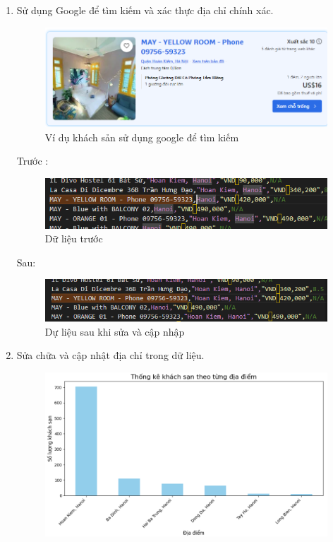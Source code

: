 \begin{itemize}
\begin{enumerate}
        \item Sử dụng Google để tìm kiếm và xác thực địa chỉ chính xác. 
        \begin{figure}[H] %
        \centering
        \includegraphics[width=0.8\linewidth]{Figures/2.6.png}
        \caption{Ví dụ khách sản sử dụng google để tìm kiếm}
        \label{fig:iot}
        \end{figure}
        Trước :
        \begin{figure}[H] %
        \centering
        \includegraphics[width=1.0\linewidth]{Figures/2.7.png}
        \caption{Dữ liệu trước}
        \label{fig:iot}
        \end{figure}
        Sau:
        \begin{figure}[H] %
        \centering
        \includegraphics[width=1.0\linewidth]{Figures/2.8.png}
        \caption{Dự liệu sau khi sửa và cập nhập}
        \label{fig:iot}
        \end{figure}
        \item Sửa chữa và cập nhật địa chỉ trong dữ liệu.
        \begin{figure}[H] %
        \centering
        \includegraphics[width=1.0\linewidth]{Figures/2.9.png}
        \label{fig:iot}
    \end{figure}
    \end{enumerate}
    

\end{itemize}
